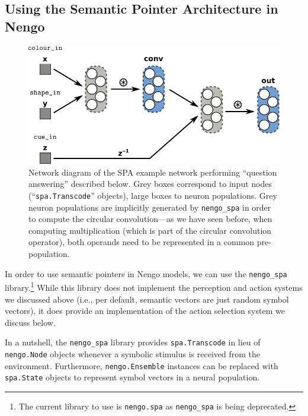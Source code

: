 \documentclass[10pt,letterpaper,oneside]{article}
\begin{document}

\subsection{Using the Semantic Pointer Architecture in Nengo}

\begin{figure}
	\centering
	\includegraphics{media/spa_network.pdf}
	\caption{Network diagram of the SPA example network performing \enquote{question answering} described below. Grey boxes correspond to input nodes (\enquote{\texttt{spa.Transcode}} objects), large boxes to neuron populations. Grey neuron populations are implicitly generated by \texttt{nengo\_spa} in order to compute the circular convolution---as we have seen before, when computing multiplication (which is part of the circular convolution operator), both operands need to be represented in a common pre-population.}
	\label{fig:spa_network}
\end{figure}

In order to use semantic pointers in Nengo models, we can use the \texttt{nengo\_spa} library.\footnote{The current library to use is \texttt{nengo.spa} as \texttt{nengo\_spa} is being deprecated.} While this library does not implement the perception and action systems we discussed above (i.e., per default, semantic vectors are just random symbol vectors), it does provide an implementation of the action selection system we discuss below.

In a nutshell, the \texttt{nengo\_spa} library provides \texttt{spa.Transcode} in lieu of \texttt{nengo.Node} objects whenever a symbolic stimulus is received from the environment. Furthermore, \texttt{nengo.Ensemble} instances can be replaced with \texttt{spa.State} objects to represent symbol vectors in a neural population.
\end{document}
